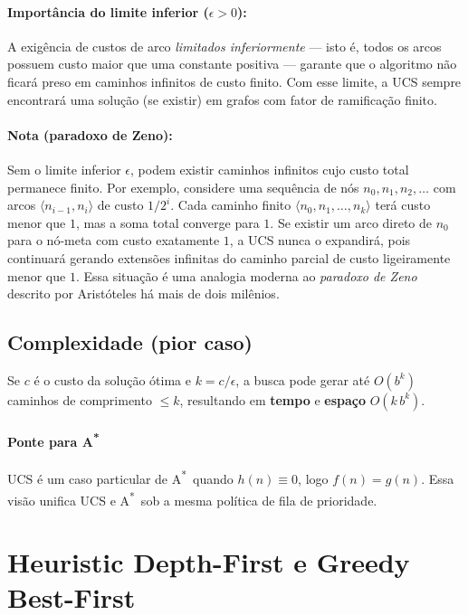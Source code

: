 \documentclass[9pt,a4paper]{extarticle}
\newcommand{\Astar}{A\textsuperscript{*}}
\begin{document}
\paragraph{Importância do limite inferior ($\epsilon>0$):}
A exigência de custos de arco \emph{limitados inferiormente}
— isto é, todos os arcos possuem custo maior que uma constante positiva —
garante que o algoritmo não ficará preso em caminhos infinitos de custo finito.
Com esse limite, a UCS sempre encontrará uma solução (se existir) em grafos com
fator de ramificação finito.

\paragraph{Nota (paradoxo de Zeno):}
Sem o limite inferior $\epsilon$, podem existir caminhos infinitos
cujo custo total permanece finito.
Por exemplo, considere uma sequência de nós
$n_0, n_1, n_2, \dots$
com arcos $\langle n_{i-1}, n_i \rangle$ de custo $1/2^i$.
Cada caminho finito
$\langle n_0, n_1, \dots, n_k \rangle$
terá custo menor que $1$,
mas a soma total converge para $1$.
Se existir um arco direto de $n_0$ para o nó-meta com custo exatamente $1$,
a UCS nunca o expandirá,
pois continuará gerando extensões infinitas do caminho parcial de custo ligeiramente menor que $1$.
Essa situação é uma analogia moderna ao \emph{paradoxo de Zeno} descrito por Aristóteles há mais de dois milênios.


\subsection*{Complexidade (pior caso)}
Se $c$ é o custo da solução ótima e $k=c/\epsilon$, a busca pode gerar até $O(b^{k})$ caminhos de comprimento $\le k$, resultando em \textbf{tempo} e \textbf{espaço} $O(k\,b^{k})$.

\paragraph{Ponte para \Astar}
UCS é um caso particular de \Astar\ quando $h(n)\equiv 0$, logo $f(n)=g(n)$.
Essa visão unifica UCS e \Astar\ sob a mesma política de fila de prioridade.

\section{Heuristic Depth-First e Greedy Best-First}
\end{document}
